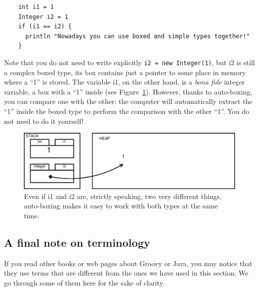 \begin{verbatim}
    int i1 = 1
    Integer i2 = 1
    if (i1 == i2) {
      println "Nowadays you can use boxed and simple types together!"
    }
\end{verbatim}

Note that you do not need to write 
explicitly \verb+i2 = new Integer(1)+, but i2 is still a complex boxed
type, its box contains just a pointer to some place in memory where a
``1'' is stored. The variable i1, on the other hand, is a \emph{bona
  fide} integer variable, a box with 
a ``1'' inside (see Figure~\ref{fig:integervars}). However, thanks
to auto-boxing, you can compare one with the other: the computer will
automatically extract the ``1'' inside the boxed type to perform the
comparison with the other ``1''. You do not need to do it yourself!

\begin{figure}[htbp]
  \centering
  \includegraphics[width=\textwidth]{gfx/variables-integer}
  \caption{Even if i1 and i2 are, strictly speaking, two very
    different things, auto-boxing makes it easy to work with both types
  at the same time.}
  \label{fig:integervars}
\end{figure}

\subsection{A final note on terminology}
\label{sec:final-note-name}

If you read other books or web pages about Groovy or Java, you may
notice that they use terms that are different from the ones we have
used in this section. We go through some of them here for the sake of
clarity. 

